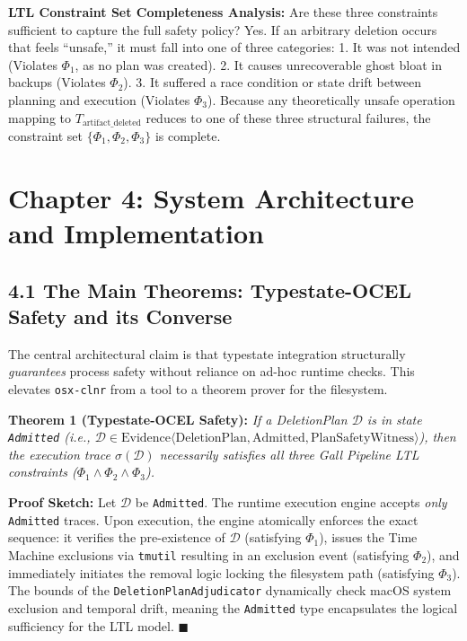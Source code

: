 \documentclass[
  12pt,
]{report}
\begin{document}
\textbf{LTL Constraint Set Completeness Analysis:} Are these three
constraints sufficient to capture the full safety policy? Yes. If an
arbitrary deletion occurs that feels ``unsafe,'' it must fall into one
of three categories: 1. It was not intended (Violates \(\Phi_1\), as no
plan was created). 2. It causes unrecoverable ghost bloat in backups
(Violates \(\Phi_2\)). 3. It suffered a race condition or state drift
between planning and execution (Violates \(\Phi_3\)). Because any
theoretically unsafe operation mapping to
\(T_{\text{artifact\_deleted}}\) reduces to one of these three
structural failures, the constraint set \(\{\Phi_1, \Phi_2, \Phi_3\}\)
is complete.

\chapter{Chapter 4: System Architecture and
Implementation}\label{chapter-4-system-architecture-and-implementation}

\section{4.1 The Main Theorems: Typestate-OCEL Safety and its
Converse}\label{the-main-theorems-typestate-ocel-safety-and-its-converse}

The central architectural claim is that typestate integration
structurally \emph{guarantees} process safety without reliance on ad-hoc
runtime checks. This elevates \texttt{osx-clnr} from a tool to a theorem
prover for the filesystem.

\textbf{Theorem 1 (Typestate-OCEL Safety):} \emph{If a DeletionPlan
\(\mathcal{D}\) is in state \texttt{Admitted} (i.e.,
\(\mathcal{D} \in \text{Evidence}\langle \text{DeletionPlan}, \text{Admitted}, \text{PlanSafetyWitness}\rangle\)),
then the execution trace \(\sigma(\mathcal{D})\) necessarily satisfies
all three Gall Pipeline LTL constraints
(\(\Phi_1 \wedge \Phi_2 \wedge \Phi_3\)).}

\textbf{Proof Sketch:} Let \(\mathcal{D}\) be \texttt{Admitted}. The
runtime execution engine accepts \emph{only} \texttt{Admitted} traces.
Upon execution, the engine atomically enforces the exact sequence: it
verifies the pre-existence of \(\mathcal{D}\) (satisfying \(\Phi_1\)),
issues the Time Machine exclusions via \texttt{tmutil} resulting in an
exclusion event (satisfying \(\Phi_2\)), and immediately initiates the
removal logic locking the filesystem path (satisfying \(\Phi_3\)). The
bounds of the \texttt{DeletionPlanAdjudicator} dynamically check macOS
system exclusion and temporal drift, meaning the \texttt{Admitted} type
encapsulates the logical sufficiency for the LTL model. \(\blacksquare\)
\end{document}
